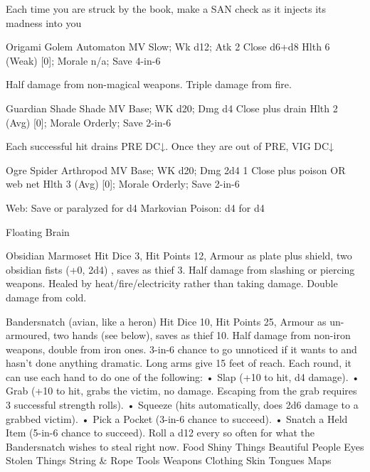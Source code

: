 {  \MONSTERBLOCK[
    Name=Furious Book,
    Link=monster-furious-book,
    MV=Fast,
    WK=d20,
    DMG=2d4 1 Close,
    HD=3,
    Power=Weak,
    Soak=0,
    Morale=Fanatical,
    Save=2,
    Extras={Aberration}
  ]

Each time you are struck by the book, make a SAN check as it injects its madness into you

  \MONSTERBLOCK[
    Name=Paper Bee,
    Link=monster-paper-bee,
    MV=Fast,
    WK=d24,
    DMG=d4 to 1 Close,
    HD=1,
    Power=Weak,
    Soak=0,
    Morale=Fanatical,
    Save=1,
    Extras={}
  ]


Origami Golem
Automaton
MV Slow; Wk d12; Atk 2 Close d6+d8
Hlth 6 (Weak) [0]; Morale n/a; Save 4-in-6

Half damage from non-magical weapons.  Triple damage from fire. 

Guardian Shade
Shade
MV Base; WK d20; Dmg d4 Close plus drain
Hlth 2 (Avg) [0]; Morale Orderly; Save 2-in-6

Each successful hit drains PRE DC↓.  Once they are out of PRE, VIG DC↓

Ogre Spider
Arthropod
MV Base; WK d20; Dmg 2d4 1 Close plus poison OR web net
Hlth 3 (Avg) [0]; Morale Orderly; Save 2-in-6

Web: Save or paralyzed for d4 Markovian
Poison: d4 for d4


Floating Brain

Obsidian Marmoset
Hit Dice 3, Hit Points 12, Armour as plate plus
shield, two obsidian fists (+0, 2d4) , saves as thief 3.
Half damage from slashing or piercing weapons.
Healed by heat/fire/electricity rather than taking
damage. Double damage from cold.

Bandersnatch (avian, like a heron)
Hit Dice 10, Hit Points 25, Armour as un-
armoured, two hands (see below), saves as thief 10.
Half damage from non-iron weapons, double from
iron ones.
3-in-6 chance to go unnoticed if it wants to and hasn’t
done anything dramatic.
Long arms give 15 feet of reach.
Each round, it can use each hand to do one of the
following:
• Slap (+10 to hit, d4 damage).
• Grab (+10 to hit, grabs the victim, no damage.
Escaping from the grab requires 3 successful
strength rolls).
• Squeeze (hits automatically, does 2d6 damage
to a grabbed victim).
• Pick a Pocket (3-in-6 chance to succeed).
• Snatch a Held Item (5-in-6 chance to succeed).
Roll a d12 every so often for what the Bandersnatch
wishes to steal right now.
Food
Shiny Things
Beautiful People
Eyes
Stolen Things
String \& Rope
Tools
Weapons
Clothing
Skin
Tongues
Maps

}
